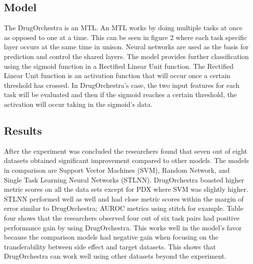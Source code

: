 \documentclass{article}
\begin{document}
\subsection{Model}
The DrugOrchestra is an MTL. An MTL works by doing multiple tasks at once as opposed to one at a time. This can be seen in figure 2 where each task specific layer occurs at the same time in unison. Neural networks are used as the basis for prediction and control the shared layers. The model provides further classification using the sigmoid function in a Rectified Linear Unit function. The Rectified Linear Unit function is an activation function that will occur once a certain threshold has crossed. In DrugOrchestra's case, the two input features for each task will be evaluated and then if the sigmoid reaches a certain threshold, the activation will occur taking in the sigmoid's data.
\subsection{Results}
After the experiment was concluded the researchers found that seven out of eight datasets obtained significant improvement compared to other models. The models in comparison are Support Vector Machines (SVM), Random Network, and Single Task Learning Neural Networks (STLNN). DrugOrchestra boasted higher metric scores on all the data sets except for PDX where SVM was slightly higher. STLNN performed well as well and had close metric scores within the margin of error similar to DrugOrchestra; AUROC metrics using stitch for example. Table four shows that the researchers observed four out of six task pairs had positive performance gain by using DrugOrchestra. This works well in the model's favor because the comparison models had negative gain when focusing on the transferability between side effect and target datasets. This shows that DrugOrchestra can work well using other datasets beyond the experiment.
\end{document}
